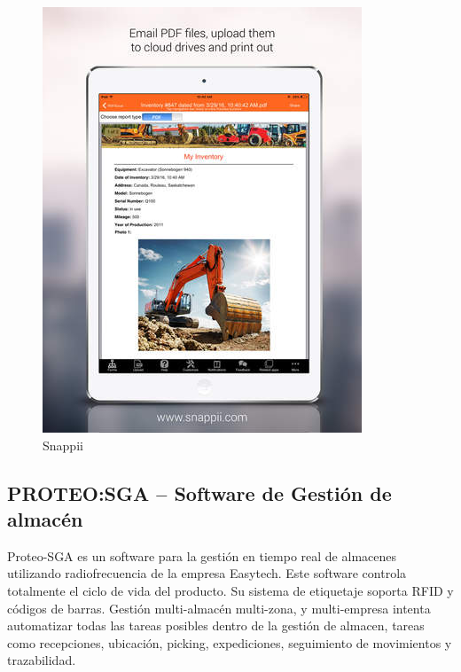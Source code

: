 \documentclass[a4paper,11pt]{book}
\begin{document}
\begin{figure}[H]  
\centering 
\includegraphics[scale=0.5]{imagenes/estudioArte/shapi.jpeg}
\caption{Snappii}  
\end{figure}


\subsection{PROTEO:SGA – Software de Gestión de almacén}
Proteo-SGA\cite{pro} es un software para la gestión en tiempo real de almacenes utilizando radiofrecuencia de la empresa Easytech\cite{easy}. Este software controla totalmente el ciclo de vida del producto. Su sistema de etiquetaje soporta RFID y códigos de barras. Gestión multi-almacén multi-zona, y multi-empresa intenta automatizar todas las tareas posibles dentro de la gestión de almacen, tareas como recepciones, ubicación, picking, expediciones, seguimiento de movimientos y trazabilidad. 
\end{document}
